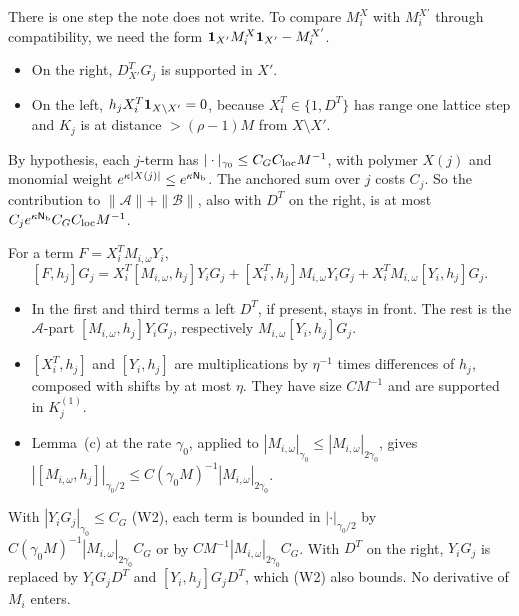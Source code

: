 \begin{detail}
\begin{step}
There is one step the note does not write. To compare $M^X_i$ with $M^{X'}_i$ through compatibility, we need the form $\mathbf 1_{X'}M^X_i\mathbf 1_{X'}-M^{X'}_i$.
\begin{itemize}
\item On the right, $D^T_{X'}G_j$ is supported in $X'$.
\item On the left, $h_jX_i^T\mathbf 1_{X\setminus X'}=0$, because $X_i^T\in\{1,D^T\}$ has range one lattice step and $K_j$ is at distance $>(\rho-1)M$ from $X\setminus X'$.
\end{itemize}
\end{step}
\begin{step}
By hypothesis, each $j$-term has $|\cdot|_{\gamma_0}\le C_GC_{\rm loc}M^{-1}$, with polymer $X(j)$ and monomial weight $e^{\kappa|X(j)|}\le e^{\kappa\mathsf N_{\rm b}}$. The anchored sum over $j$ costs $C_j$. So the contribution to $\|\mathcal A\|+\|\mathcal B\|$, also with $D^T$ on the right, is at most $C_je^{\kappa\mathsf N_{\rm b}}C_GC_{\rm loc}M^{-1}$.
\end{step}
\begin{step}
For a term $F=X^T_iM_{i,\omega}Y_i$,
\[
[F,h_j]G_j=X_i^T[M_{i,\omega},h_j]Y_iG_j+[X_i^T,h_j]M_{i,\omega}Y_iG_j+X_i^TM_{i,\omega}[Y_i,h_j]G_j .
\]
\begin{itemize}
\item In the first and third terms a left $D^T$, if present, stays in front. The rest is the $\mathcal A$-part $[M_{i,\omega},h_j]Y_iG_j$, respectively $M_{i,\omega}[Y_i,h_j]G_j$.
\item $[X_i^T,h_j]$ and $[Y_i,h_j]$ are multiplications by $\eta^{-1}$ times differences of $h_j$, composed with shifts by at most $\eta$. They have size $CM^{-1}$ and are supported in $K_j^{(1)}$.
\item Lemma~(c) at the rate $\gamma_0$, applied to $|M_{i,\omega}|_{\gamma_0}\le|M_{i,\omega}|_{2\gamma_0}$, gives $|[M_{i,\omega},h_j]|_{\gamma_0/2}\le C(\gamma_0M)^{-1}|M_{i,\omega}|_{2\gamma_0}$.
\end{itemize}
With $|Y_iG_j|_{\gamma_0}\le C_G$ (W2), each term is bounded in $|\cdot|_{\gamma_0/2}$ by $C(\gamma_0M)^{-1}|M_{i,\omega}|_{2\gamma_0}C_G$ or by $CM^{-1}|M_{i,\omega}|_{2\gamma_0}C_G$. With $D^T$ on the right, $Y_iG_j$ is replaced by $Y_iG_jD^T$ and $[Y_i,h_j]G_jD^T$, which (W2) also bounds. No derivative of $M_i$ enters.
\end{step}
\begin{step}

\end{step}
\end{detail}
